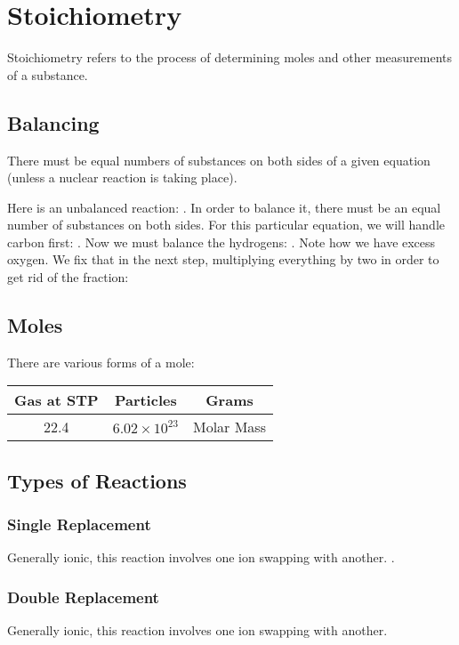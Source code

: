 \documentclass[]{article}
\begin{document}
\section{Stoichiometry}
Stoichiometry refers to the process of determining moles and other measurements of a substance.

\subsection{Balancing}
There must be equal numbers of substances on both sides of a given equation (unless a nuclear reaction is taking place). 

Here is an unbalanced reaction:
.
In order to balance it, there must be an equal number of substances on both sides. For this particular equation, we will handle carbon first:
. Now we must balance the hydrogens: . Note how we have excess oxygen. We fix that in the next step, multiplying everything by two in order to get rid of the fraction: 

\subsection{Moles}

There are various forms of a mole:

\begin{tabular}{| c | c | c|}
\hline
Gas at STP & Particles & Grams \\
\hline
22.4 & $ 6.02 \times 10^{23} $ & Molar Mass \\ 
\hline
\end{tabular}

\subsection{Types of Reactions}
\subsubsection{Single Replacement}
Generally ionic, this reaction involves one ion swapping with another. . 
\subsubsection{Double Replacement}
Generally ionic, this reaction involves one ion swapping with another. 
\end{document}
